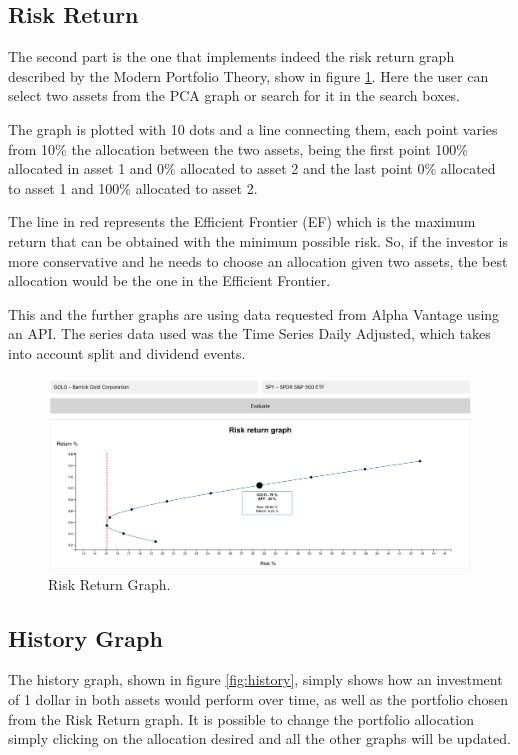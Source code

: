 \documentclass{article}
\begin{document}
\subsection{Risk Return}

The second part is the one that implements indeed the risk return graph described by the Modern Portfolio Theory, show in figure \ref{fig:mpt}. Here the user can select two assets from the PCA graph or search for it in the search boxes.

The graph is plotted with 10 dots and a line connecting them, each point varies from 10\% the allocation between the two assets, being the first point 100\% allocated in asset 1 and 0\% allocated to asset 2 and the last point 0\% allocated to asset 1 and 100\% allocated to asset 2.

The line in red represents the Efficient Frontier (EF) which is the maximum return that can be obtained with the minimum possible risk. So, if the investor is more conservative and he needs to choose an allocation given two assets, the best allocation would be the one in the Efficient Frontier.

This and the further graphs are using data requested from Alpha Vantage \cite{alpha_vantage} using an API. The series data used was the Time Series Daily Adjusted, which takes into account split and dividend events.

\begin{figure}
  \includegraphics[scale=0.25]{images/mpt.png}
  \centering
  \caption{Risk Return Graph.}
  \label{fig:mpt}
\end{figure}

\subsection{History Graph}

The history graph, shown in figure \ref{fig:history}, simply shows how an investment of 1 dollar in both assets would perform over time, as well as the portfolio chosen from the Risk Return graph. It is possible to change the portfolio allocation simply clicking on the allocation desired and all the other graphs will be updated.
\end{document}
